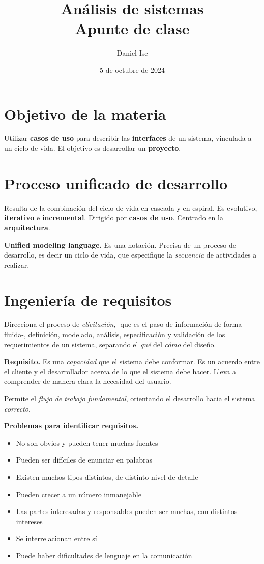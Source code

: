 \documentclass[12pt]{article}
\title{Análisis de sistemas\\Apunte de clase}
\author{Daniel Ise}
\date{5 de octubre de 2024}
\begin{document}
\maketitle

\tableofcontents

\section{Objetivo de la materia}

Utilizar \textbf{casos de uso} para describir las \textbf{interfaces} de un 
sistema, vinculada a un ciclo de vida.
El objetivo es desarrollar un \textbf{proyecto}.

\section{Proceso unificado de desarrollo}

Resulta de la combinación del ciclo de vida en cascada
y en espiral.
Es evolutivo, \textbf{iterativo} e \textbf{incremental}.
Dirigido por \textbf{casos de uso}.
Centrado en la \textbf{arquitectura}.

\textbf{Unified modeling language.}
Es una notación.
Precisa de un proceso de desarrollo, es decir un ciclo de vida,
que especifique la \textit{secuencia} de actividades a realizar.

\section{Ingeniería de requisitos}

Direcciona el proceso de \textit{elicitación},
-que es el paso de información de forma fluida-,
definición,
modelado,
análisis,
especificación
y validación de los requerimientos de un sistema,
separando el \textit{qué} del \textit{cómo} del diseño.

\textbf{Requisito.}
Es una \textit{capacidad} que el sistema debe conformar. 
Es un acuerdo entre el cliente y el desarrollador acerca de 
lo que el sistema debe hacer.
Lleva a comprender de manera clara la necesidad del usuario.

Permite el \textit{flujo de trabajo fundamental},
orientando el desarrollo hacia el sistema \textit{correcto}.

\textbf{Problemas para identificar requisitos.}
\begin{itemize}
    \item No son obvios y pueden tener muchas fuentes
    \item Pueden ser difíciles de enunciar en palabras
    \item Existen muchos tipos distintos, de distinto nivel de detalle
    \item Pueden crecer a un número inmanejable
    \item Las partes interesadas y responsables pueden ser muchas,
    con distintos intereses
    \item Se interrelacionan entre sí 
    \item Puede haber dificultades de lenguaje en la comunicación
\end{itemize}
\end{document}
